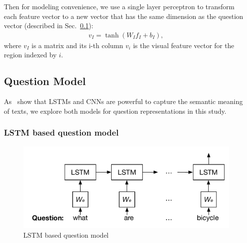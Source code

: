 \documentclass[10pt,twocolumn,letterpaper]{article}
\begin{document}
Then for modeling convenience, we use a single layer perceptron to transform
each feature vector to a new vector that has the same dimension as the question
vector (described in Sec.~\ref{sec:question_model}):
\begin{align}
  v_I = \tanh(W_If_I + b_I),
\end{align}
where $v_{I}$ is a matrix and its i-th column $v_{i}$ is the visual feature
vector for the region indexed by $i$.

\subsection{Question Model}
\label{sec:question_model}
As~\cite{sutskever2014sequence, shen2014latent, fang2014captions} show that
LSTMs and CNNs are powerful to capture the semantic meaning of texts, we
explore both models for question representations in this study.

\vspace{-0.2cm}
\subsubsection{LSTM based question model}
\label{sec:question_lstm}
\begin{figure}[tbh]
  \vspace{-0.6cm}
  \includegraphics[width=\linewidth]{lstm_att.pdf}
  \centering
  \caption{LSTM based question model}
  \label{fig:lstm}
  \vspace{-0.2cm}
\end{figure}
\end{document}
